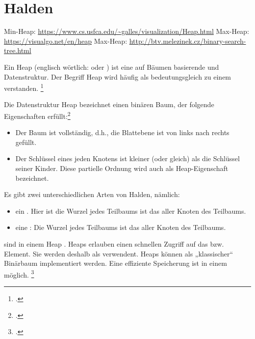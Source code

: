 \documentclass{lehramt-informatik-haupt}
\begin{document}

\chapter{Halden}

\begin{quellen}
\item \cite[Seite 25-32]{aud:fs:tafeluebung-11}
\item \cite{wiki:heap}
\item \cite[Seite 407-409 (PDF 423-425), Kapitel 14.6.1]{saake}
\end{quellen}

Min-Heap: \url{https://www.cs.usfca.edu/~galles/visualization/Heap.html}
Max-Heap: \url{https://visualgo.net/en/heap}
Max-Heap: \url{http://btv.melezinek.cz/binary-search-tree.html}

\noindent
Ein Heap (englisch wörtlich:  oder ) ist
eine auf Bäumen basierende  und
 Datenstruktur.
%
Der Begriff Heap wird häufig als bedeutungsgleich zu einem
 verstanden.
\footcite{wiki:heap}

Die Datenstruktur Heap bezeichnet einen binären Baum, der folgende
Eigenschaften erfüllt:\footcite[Seite 407 (PDF 423), Kapitel 14.6.1]{saake}

\begin{itemize}
\item Der Baum ist vollständig, d.h., die Blattebene ist von links nach
rechts gefüllt.

\item Der Schlüssel eines jeden Knotens ist kleiner (oder gleich) als
die Schlüssel seiner Kinder. Diese partielle Ordnung wird auch als
Heap-Eigenschaft bezeichnet.
\end{itemize}

%
Es gibt zwei unterschiedlichen Arten von Halden, nämlich:

\begin{itemize}
\item ein . Hier ist die Wurzel jedes Teilbaums ist das
 aller Knoten des Teilbaums.
%
\item eine : Die Wurzel jedes Teilbaums ist das
 aller Knoten des Teilbaums.
\end{itemize}
%
 sind in einem Heap .
%
Heaps erlauben einen schnellen Zugriff auf das  bzw.
 Element. Sie werden deshalb als
 verwendent.
%
Heaps können als „klassischer“ Binärbaum implementiert werden. Eine
effiziente Speicherung ist in einem  möglich.
\footcite[Seite 22]{aud:fs:tafeluebung-11}
\end{document}
